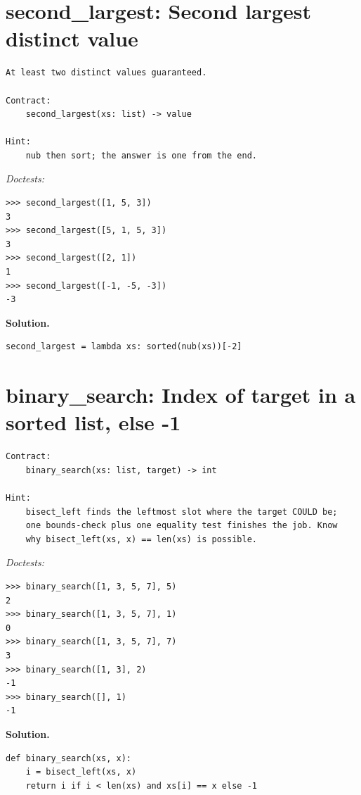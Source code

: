 \documentclass[11pt,letterpaper]{book}
\begin{document}
\section{second\_largest: Second largest distinct value}
\begin{lstlisting}[style=spec]
At least two distinct values guaranteed.

Contract:
    second_largest(xs: list) -> value

Hint:
    nub then sort; the answer is one from the end.
\end{lstlisting}
\noindent\textit{Doctests:}
\begin{lstlisting}[style=spec]
>>> second_largest([1, 5, 3])
3
>>> second_largest([5, 1, 5, 3])
3
>>> second_largest([2, 1])
1
>>> second_largest([-1, -5, -3])
-3
\end{lstlisting}
\noindent\textbf{Solution.}
\begin{lstlisting}[style=code]
second_largest = lambda xs: sorted(nub(xs))[-2]
\end{lstlisting}

\section{binary\_search: Index of target in a sorted list, else -1}
\begin{lstlisting}[style=spec]
Contract:
    binary_search(xs: list, target) -> int

Hint:
    bisect_left finds the leftmost slot where the target COULD be;
    one bounds-check plus one equality test finishes the job. Know
    why bisect_left(xs, x) == len(xs) is possible.
\end{lstlisting}
\noindent\textit{Doctests:}
\begin{lstlisting}[style=spec]
>>> binary_search([1, 3, 5, 7], 5)
2
>>> binary_search([1, 3, 5, 7], 1)
0
>>> binary_search([1, 3, 5, 7], 7)
3
>>> binary_search([1, 3], 2)
-1
>>> binary_search([], 1)
-1
\end{lstlisting}
\noindent\textbf{Solution.}
\begin{lstlisting}[style=code]
def binary_search(xs, x):
    i = bisect_left(xs, x)
    return i if i < len(xs) and xs[i] == x else -1
\end{lstlisting}
\end{document}
